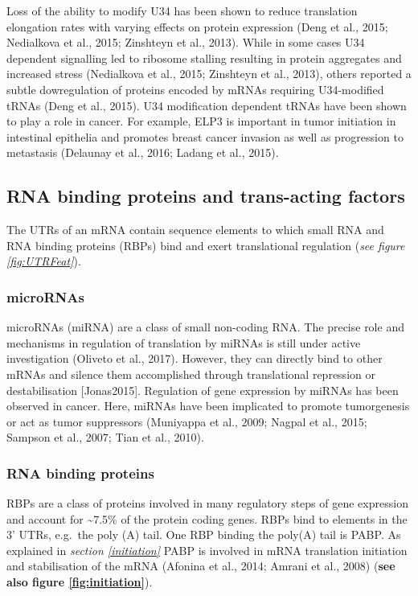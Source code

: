 \documentclass[12pt,openany]{book}
\begin{document}
Loss of the ability to modify U34 has been shown to reduce translation
elongation rates with varying effects on protein expression (Deng et
al., 2015; Nedialkova et al., 2015; Zinshteyn et al., 2013). While in
some cases U34 dependent signalling led to ribosome stalling resulting
in protein aggregates and increased stress (Nedialkova et al., 2015;
Zinshteyn et al., 2013), others reported a subtle dowregulation of
proteins encoded by mRNAs requiring U34-modified tRNAs (Deng et al.,
2015). U34 modification dependent tRNAs have been shown to play a role
in cancer. For example, ELP3 is important in tumor initiation in
intestinal epithelia and promotes breast cancer invasion as well as
progression to metastasis (Delaunay et al., 2016; Ladang et al., 2015).

\subsection{RNA binding proteins and trans-acting factors}

The UTRs of an mRNA contain sequence elements to which small RNA and RNA
binding proteins (RBPs) bind and exert translational regulation
(\emph{see figure \ref{fig:UTRFeat}}).

\subsubsection{microRNAs} microRNAs (miRNA) are a class of small
non-coding RNA. The precise role and mechanisms in regulation of
translation by miRNAs is still under active investigation (Oliveto et
al., 2017). However, they can directly bind to other mRNAs and silence
them accomplished through translational repression or destabilisation
{[}Jonas2015{]}. Regulation of gene expression by miRNAs has been
observed in cancer. Here, miRNAs have been implicated to promote
tumorgenesis or act as tumor suppressors (Muniyappa et al., 2009; Nagpal
et al., 2015; Sampson et al., 2007; Tian et al., 2010).

\subsubsection{RNA binding proteins}

RBPs are a class of proteins involved in many regulatory steps of gene
expression and account for \textasciitilde{}7.5\% of the protein coding
genes. RBPs bind to elements in the 3' UTRs, e.g.~the poly (A) tail. One
RBP binding the poly(A) tail is PABP. As explained in \emph{section
\ref{initiation}} PABP is involved in mRNA translation initiation and
stabilisation of the mRNA (Afonina et al., 2014; Amrani et al., 2008)
(\textbf{see also figure \ref{fig:initiation}}).
\end{document}
